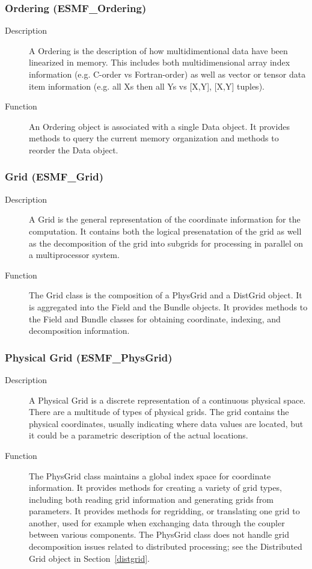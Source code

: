 \subsubsection{Ordering (ESMF\_Ordering)}
\label{sec:ordering} 
\begin{description}
\item [Description] A Ordering is the description of how multidimentional data have been
linearized in memory.  This includes both multidimensional array index information (e.g. C-order
vs Fortran-order) as well as vector or tensor data item information (e.g. all Xs then all
Ys vs [X,Y], [X,Y] tuples).
\item [Function] An Ordering object is associated with a single Data object.  It provides
methods to query the current memory organization and methods to reorder the Data object.
\end{description}

\subsubsection{Grid (ESMF\_Grid)}
\label{sec:ordering} 
\begin{description}
\item [Description] A Grid is the general representation of the coordinate information for
the computation.  It contains both the logical presenatation of the grid as well as the
decomposition of the grid into subgrids for processing in parallel on a
multiprocessor system.
\item [Function] The Grid class is the composition of a PhysGrid and a DistGrid object.  
It is aggregated into the Field and the Bundle objects.  It provides methods to the
Field and Bundle classes for obtaining coordinate, indexing, and decomposition information.
\end{description}

\subsubsection{Physical Grid (ESMF\_PhysGrid)}
\label{sec:physgrid} 
\begin{description}
\item [Description] A Physical Grid is a discrete representation of a continuous physical space.
There are a multitude of types of physical grids.
The grid contains the physical coordinates, usually indicating where data values are located, but
it could be a parametric description of the actual locations.  
\item [Function] The PhysGrid class maintains a global index space for coordinate information.
It provides methods for creating a variety of grid types, including both reading grid information
and generating grids from parameters.  It provides methods for regridding, or translating
one grid to another, used for example when exchanging data through the coupler between
various components.
The PhysGrid class does not handle grid decomposition issues related to 
distributed processing; see the Distributed Grid object in Section~\ref{distgrid}.
\end{description}

